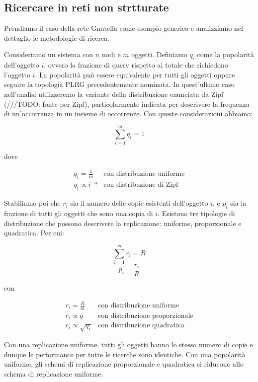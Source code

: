 \subsection{Ricercare in reti non strtturate}\label{ricercare-in-reti-non-strtturate}

Prendiamo il caso della rete Gnutella come esempio generico e analizziamo nel dettaglio le metodologie di ricerca.

Consideriamo un sistema con $n$ nodi e $m$ oggetti. Definiamo $q_i$ come la popolarità dell'oggetto $i$, ovvero la frazione di query rispetto al totale che richiedono l'oggetto $i$. La popolarità può essere equivalente per tutti gli oggetti oppure seguire la topologia PLRG precedentemente nominata. In quest'ultimo caso nell'analisi utilizzeremo la variante della distribuzione enunciata da Zipf (///TODO: fonte per Zipf), particolarmente indicata per descrivere la frequenza di un'occorrenza in un insieme di occorrenze. Con queste considerazioni abbiamo:

\[ \sum^m_{i=1} q_i = 1 \]

dove

\[ \begin{array}{ll} 
    q_i = \frac{1}{m} & \textrm{con distribuzione uniforme} \\
    q_i \propto i^{-\alpha} & \textrm{con distribuzione di Zipf}
    \end{array}
\]

Stabiliamo poi che $r_i$ sia il numero delle copie esistenti dell'oggetto $i$, e $p_i$ sia la frazione di tutti gli oggetti che sono una copia di $i$. Esistono tre tipologie di distribuzione che possono descrivere la replicazione: uniforme, proporzionale e quadratica. Per cui:

\[ \sum^m_{i=1} r_i = R \] \[ p_i = \frac{r_i}{R} \]

con

\[ \begin{array}{ll} 
    r_i = \frac{R}{m} & \textrm{con distribuzione uniforme} \\
    r_i \propto q & \textrm{con distribuzione proporzionale} \\
    r_i \propto \sqrt{q_i} & \textrm{con distribuzione quadratica}
    \end{array}
\]

Con una replicazione uniforme, tutti gli oggetti hanno lo stesso numero di copie e dunque le performance per tutte le ricerche sono identiche. Con una popolarità uniforme, gli schemi di replicazione proporzionale e quadratica si riducono allo schema di replicazione uniforme.

